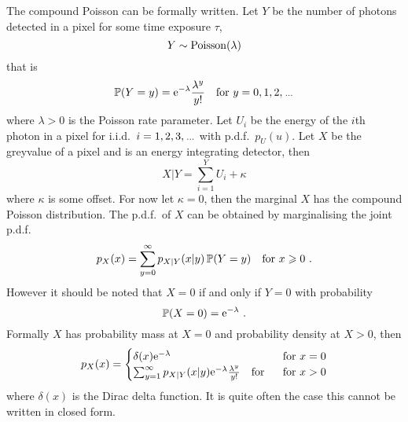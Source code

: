 The compound Poisson can be formally written. Let $Y$ be the number of photons detected in a pixel for some time exposure $\tau$,
\begin{equation*}
	Y\sim\operatorname{Poisson}(\lambda)
\end{equation*}
that is
\begin{equation*}
	\prob(Y=y)=\euler^{-\lambda}\frac{\lambda^y}{y!} \quad \text{for }y=0,1,2,\dotdotdot
\end{equation*}
where $\lambda>0$ is the Poisson rate parameter. Let $U_i$ be the energy of the $i$th photon in a pixel for i.i.d.~$i=1,2,3,\dotdotdot$ with p.d.f.~$p_U(u)$. Let $X$ be the greyvalue of a pixel and is an energy integrating detector, then
\begin{equation}
	X|Y = \sum_{i=1}^{Y}U_i+\kappa
	\label{eq:compoundPoisson_X|Y}
\end{equation}
where $\kappa$ is some offset. For now let $\kappa=0$, then the marginal $X$ has the compound Poisson distribution. The p.d.f.~of $X$ can be obtained by marginalising the joint p.d.f.
\begin{equation*}
	p_X(x)=\sum_{y=0}^\infty p_{X|Y}(x|y)\operatorname{\mathbb{P}}(Y=y) \quad\text{for }x\geqslant 0
	\ .
\end{equation*}
However it should be noted that $X=0$ if and only if $Y=0$ with probability
\begin{equation*}
	\operatorname{\mathbb{P}}(X=0)=\mathrm{e}^{-\lambda} \ .
\end{equation*}
Formally $X$ has probability mass at $X=0$ and probability density at $X>0$, then 
\begin{equation}
	p_X(x) = 
	\begin{cases}
		\delta(x) \mathrm{e}^{-\lambda}  & \text{ for } x=0 \\ 
		\sum_{y=1}^\infty p_{X|Y}(x|y)\mathrm{e}^{-\lambda}\frac{\lambda^y}{y!} \quad\text{for } & \text{ for } x>0
	\end{cases}
\end{equation}
where $\delta(x)$ is the Dirac delta function. It is quite often the case this cannot be written in closed form.

